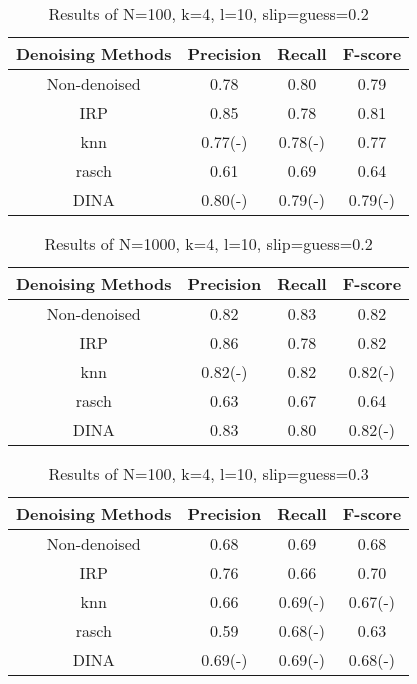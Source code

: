 \documentclass[11pt]{article}
\begin{document}
\begin{table}[!h]
\begin{center}
\begin{tabular}{|c|c|c|c|}
\hline
Denoising Methods & Precision & Recall & F-score\\
\hline
Non-denoised & 0.78 & 0.80 & 0.79  \\
\hline
IRP & 0.85 & 0.78 & 0.81 \\
\hline
knn & 0.77(-) & 0.78(-) & 0.77 \\
\hline
rasch & 0.61 & 0.69 & 0.64 \\
\hline
DINA & 0.80(-) & 0.79(-) & 0.79(-) \\
\hline
\end{tabular}
\end{center}
\caption{Results of N=100, k=4, l=10, slip=guess=0.2}\label{tab:results15}
\end{table}


\begin{table}[!h]
\begin{center}
\begin{tabular}{|c|c|c|c|}
\hline
Denoising Methods & Precision & Recall & F-score\\
\hline
Non-denoised & 0.82 & 0.83 & 0.82  \\
\hline
IRP & 0.86 & 0.78 & 0.82 \\
\hline
knn & 0.82(-) & 0.82 & 0.82(-) \\
\hline
rasch & 0.63 & 0.67 & 0.64 \\
\hline
DINA & 0.83 & 0.80 & 0.82(-) \\
\hline
\end{tabular}
\end{center}
\caption{Results of N=1000, k=4, l=10, slip=guess=0.2}\label{tab:results16}
\end{table}


\begin{table}[!h]
\begin{center}
\begin{tabular}{|c|c|c|c|}
\hline
Denoising Methods & Precision & Recall & F-score\\
\hline
Non-denoised & 0.68 & 0.69 & 0.68  \\
\hline
IRP & 0.76 & 0.66 & 0.70 \\
\hline
knn & 0.66 & 0.69(-) & 0.67(-) \\
\hline
rasch & 0.59 & 0.68(-) & 0.63 \\
\hline
DINA & 0.69(-) & 0.69(-) & 0.68(-) \\
\hline
\end{tabular}
\end{center}
\caption{Results of N=100, k=4, l=10, slip=guess=0.3}\label{tab:results17}
\end{table}
\end{document}
